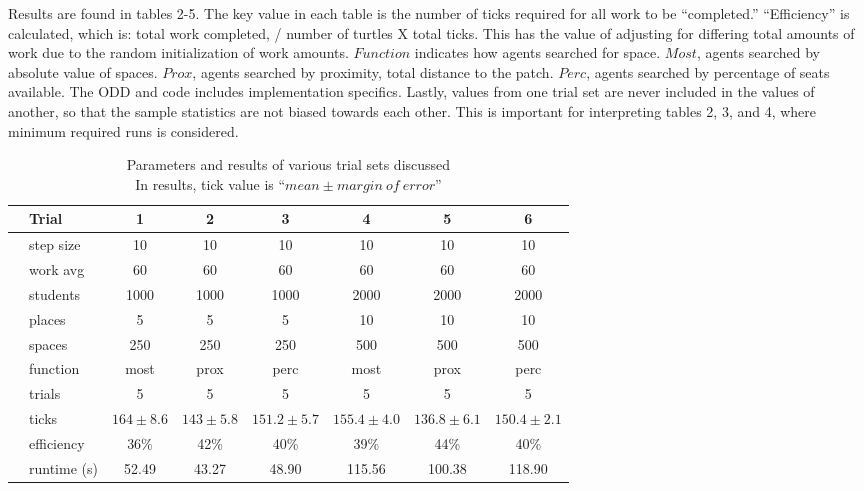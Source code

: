 \documentclass[11pt]{article} %
\begin{document}
Results are found in tables 2-5. The key value in each table is the number of ticks required for all work to be ``completed.'' ``Efficiency'' is calculated, which is:  total work completed, / number of turtles X total ticks. This has the value of adjusting for differing total amounts of work due to the random initialization of work amounts. $Function$ indicates how agents searched for space. $Most$, agents searched by absolute value of spaces. $Prox$, agents searched by proximity, total distance to the patch. $Perc$, agents searched by percentage of seats available. The ODD and code includes implementation specifics. Lastly, values from one trial set are never included in the values of another, so that the sample statistics are not biased towards each other. This is important for interpreting tables 2, 3, and 4, where  minimum required runs is considered. 


\begin{table}[]
\footnotesize
\centering
\begin{tabular}{l|l|ccc|ccc}
 & Trial & 1 & 2 & 3 & 4 & 5 & 6  \\ \hline
  \parbox[t]{2mm}{} 
 & step size 	& 10  			& 10  			& 10 			& 10 					& 10 				& 10  \\
 & work avg 	& 60 			&  60 			& 60			& 60 					& 60 				& 60 \\
 & students 	& 1000 			& 1000 			& 1000 			& 2000 					& 2000 				& 2000 \\
 & places 		& 5 			& 5 			& 5 			& 10 					& 10 				& 10 \\
 & spaces 		& 250 			& 250 			& 250 			& 500 					& 500 				& 500 \\
 & function 	& most 			& prox 			& perc 			& most 					& prox 				& perc \\
 & trials 		& 5 			& 5 			& 5 			& 5 					& 5 				& 5 \\ \hline
\parbox[t]{2mm}{} 
 & ticks 		& $164\pm 8.6$ 	& $143\pm 5.8$ 	& $151.2\pm 5.7$	& $155.4\pm 4.0$	& $136.8\pm 6.1$	& $150.4\pm 2.1$ \\
 & efficiency 	& 36\%			& 42\%			& 40\%				& 39\%				& 44\%				& 40\% \\
 & runtime (s) 	& 52.49			& 43.27			& 48.90				& 115.56			& 100.38			& 118.90
\end{tabular}
\caption{Parameters and results of various trial sets discussed \\ \footnotesize In results, tick value is ``$mean \pm margin \: of \: error$''}
\end{table}
\end{document}
